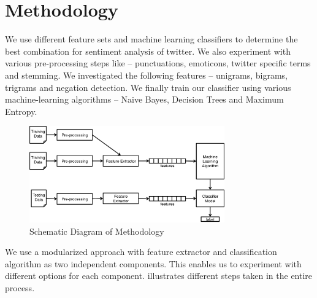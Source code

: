 \section{Methodology}
We use different feature sets and machine learning classifiers to determine the
best combination for sentiment analysis of twitter. We also experiment with
various pre-processing steps like -- punctuations, emoticons, twitter specific
terms and stemming.  We investigated the following features -- unigrams,
bigrams, trigrams and negation detection. We finally train our classifier using
various machine-learning algorithms -- Naive Bayes, Decision Trees and Maximum
Entropy.

\begin{figure}[h!]
\centering
\includegraphics[width=0.75\textwidth]{img/schematic.png}
\caption{Schematic Diagram of Methodology}
\label{fig:schematic}
\end{figure}

We use a modularized approach with feature extractor and classification
algorithm as two independent components. This enables us to experiment with
different options for each component.  illustrates
different steps taken in the entire process.









